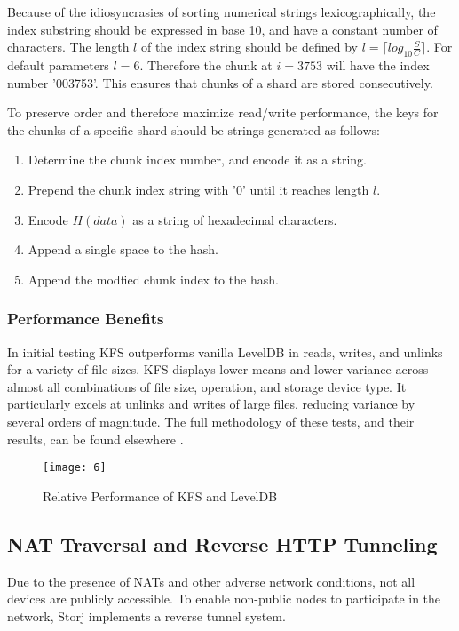 \documentclass[a4paper,10pt]{article}
\begin{document}
Because of the idiosyncrasies of sorting numerical strings lexicographically, the index substring should be expressed in base 10, and have a constant number of characters. The length $ l $ of the index string should be defined by $ l = \lceil log_{10} \frac{S}{C} \rceil $. For default parameters $ l = 6 $. Therefore the chunk at $ i = 3753 $ will have the index number '003753'. This ensures that chunks of a shard are stored consecutively.

To preserve order and therefore maximize read/write performance, the keys for the chunks of a specific shard should be strings generated as follows:

\begin{enumerate}
\item Determine the chunk index number, and encode it as a string.
\item Prepend the chunk index string with '0' until it reaches length $ l $.
\item Encode $ H(data) $ as a string of hexadecimal characters.
\item Append a single space to the hash.
\item Append the modfied chunk index to the hash.
\end{enumerate}

\subsubsection{Performance Benefits}
In initial testing KFS outperforms vanilla LevelDB in reads, writes, and unlinks for a variety of file sizes. KFS displays lower means and lower variance across almost all combinations of file size, operation, and storage device type. It particularly excels at unlinks and writes of large files, reducing variance by several orders of magnitude. The full methodology of these tests, and their results, can be found elsewhere \cite{13}.

\begin{figure}[hbt]
\centering
\texttt{[image: 6]}
\caption{Relative Performance of KFS and LevelDB}
\end{figure}

\subsection{NAT Traversal and Reverse HTTP Tunneling}
Due to the presence of NATs and other adverse network conditions, not all devices are publicly accessible. To enable non-public nodes to participate in the network, Storj implements a reverse tunnel system.
\end{document}
